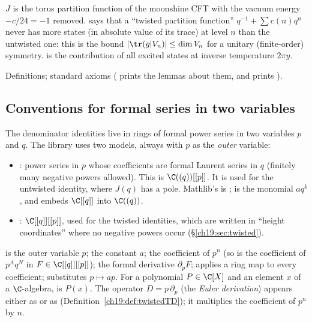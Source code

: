 \begin{physics}
$J$ is the torus partition function of the moonshine CFT with the vacuum energy $-c/24=-1$ removed.
 says that a ``twisted partition function'' $q^{-1}+\sum c(n)q^n$ never has more states (in
absolute value of its trace) at level $n$ than the untwisted one: this is the bound $|\tr(g|V_n)|\le\dim V_n$ for a
unitary (finite-order) symmetry.   is the contribution of all excited states at inverse temperature
$2\pi y$.
\end{physics}
\begin{status}
Definitions; standard axioms ( prints the lemmas about them,
and  prints ).
\end{status}

\subsection{Conventions for formal series in two variables}\label{ch19:sec:formalconv}

The denominator identities live in rings of formal power series in two variables $p$ and $q$.  The library uses two
models, always with $p$ as the \emph{outer} variable:
\begin{itemize}
\item {}: power series in $p$ whose coefficients are formal Laurent series in $q$
  (finitely many negative powers allowed).  This is $\C((q))[[p]]$.  It is used for the untwisted identity, where
  $J(q)$ has a pole.  Mathlib's  is ;  is
  the monomial $aq^k$, and  embeds $\C[[q]]$ into $\C((q))$.
\item {}: $\C[[q]][[p]]$, used for the twisted identities, which are written in
  ``height coordinates'' where no negative powers occur (\S\ref{ch19:sec:twisted}).
\end{itemize}
 is the outer variable $p$;  the constant $a$; 
the coefficient of $p^n$ (so  is the coefficient of $p^Aq^N$ in
$F\in\C[[q]][[p]]$);  the formal derivative $\partial_pF$; 
applies a ring map to every coefficient;  substitutes $p\mapsto ap$.  For a polynomial
$P\in\C[X]$ and an element $x$ of a $\C$-algebra,  is $P(x)$.  The operator $D=p\,\partial_p$ (the
\emph{Euler derivation}) appears either as  or as 
(Definition~\ref{ch19:def:twistedTD}); it multiplies the coefficient of $p^n$ by $n$.


